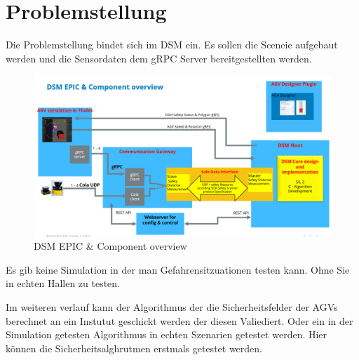 \section{Problemstellung}
Die Problemstellung bindet sich im DSM ein. Es sollen die Sceneie aufgebaut werden und die Sensordaten dem gRPC Server bereitgestellten werden.
\begin{figure}[htp]
    \centering
    \includegraphics[width=(\textwidth)]{images/AGV_Overview.png}
    \caption{DSM EPIC \& Component overview}
    \label{fig:DSMoverview}
\end{figure}

Es gib keine Simulation in der man Gefahrensitzuationen testen kann. Ohne Sie in echten Hallen zu testen.


Im weiteren verlauf kann der Algorithmus der die Sicherheitsfelder der AGVs berechnet an ein Instutut geschickt werden der diesen Valiediert. Oder ein in der Simulation getesten Algorithmus in echten Szenarien getestet werden.
Hier können die Sicherheitsalghrutmen erstmals getestet werden.


